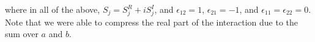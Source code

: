 \documentclass[../../RotatingBosons.tex]{subfiles}
\begin{document}
\eea 
%
where in all of the above, $S_{j} = S_{j}^{R}+ i S_{j}^{I}$, and $\epsilon_{12} =1$, $\epsilon_{21} =-1$, and  $\epsilon_{11} = \epsilon_{22} = 0$. Note that we were able to compress the real part of the interaction due to the sum over $a$ and $b$. 

\end{document}
